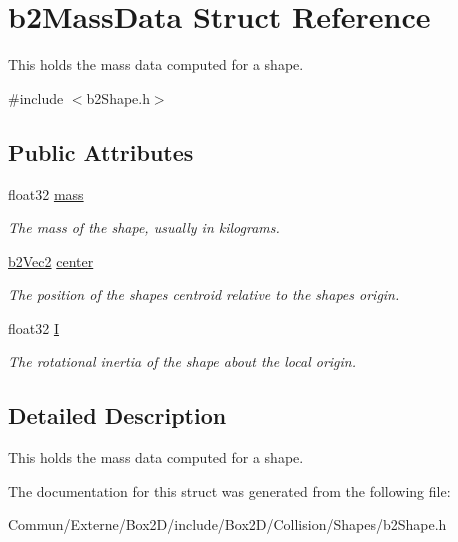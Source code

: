 \hypertarget{structb2_mass_data}{}\section{b2\+Mass\+Data Struct Reference}
\label{structb2_mass_data}


This holds the mass data computed for a shape.  




{\ttfamily \#include $<$b2\+Shape.\+h$>$}

\subsection*{Public Attributes}
\begin{DoxyCompactItemize}
\item 
float32 \hyperlink{structb2_mass_data_aea85d9595a38d2eed05b8d2ea80d97b1}{mass}\hypertarget{structb2_mass_data_aea85d9595a38d2eed05b8d2ea80d97b1}{}\label{structb2_mass_data_aea85d9595a38d2eed05b8d2ea80d97b1}

\begin{DoxyCompactList}\small\item\em The mass of the shape, usually in kilograms. \end{DoxyCompactList}\item 
\hyperlink{structb2_vec2}{b2\+Vec2} \hyperlink{structb2_mass_data_a1d59bebc7030c4dded0c2febc57ebdd7}{center}\hypertarget{structb2_mass_data_a1d59bebc7030c4dded0c2febc57ebdd7}{}\label{structb2_mass_data_a1d59bebc7030c4dded0c2febc57ebdd7}

\begin{DoxyCompactList}\small\item\em The position of the shape\textquotesingle{}s centroid relative to the shape\textquotesingle{}s origin. \end{DoxyCompactList}\item 
float32 \hyperlink{structb2_mass_data_ad2d06e96e2d79d895df16ae0e5fe0376}{I}\hypertarget{structb2_mass_data_ad2d06e96e2d79d895df16ae0e5fe0376}{}\label{structb2_mass_data_ad2d06e96e2d79d895df16ae0e5fe0376}

\begin{DoxyCompactList}\small\item\em The rotational inertia of the shape about the local origin. \end{DoxyCompactList}\end{DoxyCompactItemize}


\subsection{Detailed Description}
This holds the mass data computed for a shape. 

The documentation for this struct was generated from the following file\+:\begin{DoxyCompactItemize}
\item 
Commun/\+Externe/\+Box2\+D/include/\+Box2\+D/\+Collision/\+Shapes/b2\+Shape.\+h\end{DoxyCompactItemize}
